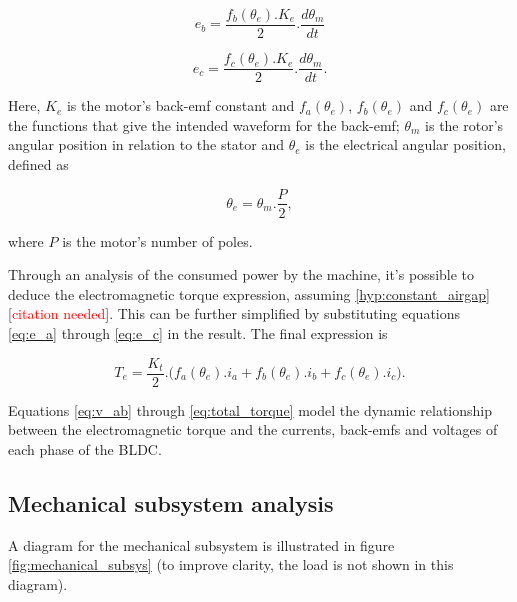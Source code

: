 \documentclass{article}
\begin{document}
    \begin{equation}
        e_b = \frac{f_b(\theta_e).K_e}{2}.\frac{d\theta_m}{dt}
        \label{eq:e_b}
    \end{equation}

    \begin{equation}
        e_c = \frac{f_c(\theta_e).K_e}{2}.\frac{d\theta_m}{dt}.
        \label{eq:e_c}
    \end{equation}

    Here, $K_e$ is the motor's back-emf constant and $f_a(\theta_e)$, $f_b(\theta_e)$ and $f_c(\theta_e)$ are the functions that give the intended waveform for the back-emf; $\theta_m$ is the rotor's angular position in relation to the stator and $\theta_e$ is the electrical angular position, defined as

    \begin{equation}
        \theta_e = \theta_m.\frac{P}{2},
    \end{equation}

    where $P$ is the motor's number of poles.

    Through an analysis of the consumed power by the machine, it's possible to deduce the electromagnetic torque expression, assuming \ref{hyp:constant_airgap} [\textcolor{red}{citation needed}]. This can be further simplified by substituting equations \ref{eq:e_a} through \ref{eq:e_c} in the result. The final expression is

    \begin{equation}
        T_e = \frac{K_t}{2}.\Big(f_a(\theta_e).i_a + f_b(\theta_e).i_b + f_c(\theta_e).i_c\Big).
        \label{eq:total_torque}
    \end{equation}

    Equations \ref{eq:v_ab} through \ref{eq:total_torque} model the dynamic relationship between the electromagnetic torque and the currents, back-emfs and voltages of each phase of the BLDC.




    \subsection{Mechanical subsystem analysis}

    A diagram for the mechanical subsystem is illustrated in figure \ref{fig:mechanical_subsys} (to improve clarity, the load is not shown in this diagram).
\end{document}
